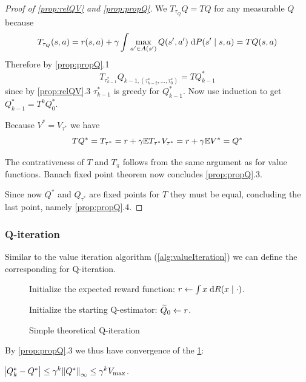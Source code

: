 \begin{proof}[Proof of \cref{prop:relQV} and \cref{prop:propQ}]
    We $T_{\tau_Q} Q = T Q$ for any measurable $Q$ because
  \[ T_{\tau_Q}(s, a) = r(s, a) + \gamma \int \max_{a' \in A(s')} Q(s', a')
  \; \mathrm{d} P(s' \mid s, a) = TQ(s, a) \]
  Therefore by \cref{prop:propQ}.1
  \[ T_{\tau_{k-1}^*} Q_{k-1, (\tau_{k-2}^*, \dots, \tau_0^*)}
  = T Q_{k-1}^* \]
  since by \cref{prop:relQV}.3 $\tau_{k-1}^*$ is greedy for $Q_{k-1}^*$.
  Now use induction to get $Q^*_{k-1} = T^k Q_0^*$.

  Because $V^* = V_{\tau^*}$ we have
  \[ TQ^* = T_{\tau^*} = r + \gamma \mathbb{E} T_{\tau^*} V_{\tau^*}
  = r + \gamma \mathbb{E} V^* = Q^* \]

  The contrativeness of $T$ and $T_\pi$ follows from the same argument as for
  value functions.
  Banach fixed point theorem now concludes \cref{prop:propQ}.3.

  Since now $Q^*$ and $Q_{\tau^*}$ are fixed points for $T$ they must be
  equal, concluding the last point, namely \cref{prop:propQ}.4.
\end{proof}

\subsubsection{Q-iteration}

Similar to the value iteration algorithm (\cref{alg:valueIteration}) we can
define the corresponding for Q-iteration.

\begin{figure}[H]
\begin{algorithm}[H] %
\caption{Simple theoretical Q-iteration}
Initialize the expected reward function:
$r \leftarrow \int x \; \mathrm{d} R(x \mid \cdot)$.

Initialize the starting Q-estimator: $\widetilde{Q}_0 \leftarrow r$.

\label{alg:theoSimpleQ}
\end{algorithm}
\end{figure}

By \cref{prop:propQ}.3 we thus have convergence of the \cref{alg:theoSimpleQ}:
\begin{cor}
  $\abs{Q^*_k - Q^*} \leq \gamma^k \norm{Q^*}_\infty
  \leq \gamma^k V_{\max}$.
  \label{prop:theoSimpleQConv}
\end{cor}

